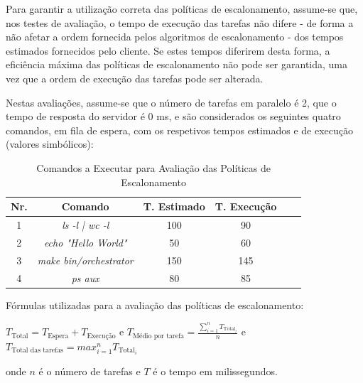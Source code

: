 \documentclass[a4paper,11pt]{scrreprt}
\begin{document}
    Para garantir a utilização correta das políticas de escalonamento,
    assume-se que, nos testes de avaliação, o tempo de execução das tarefas
    não difere - de forma a não afetar a ordem fornecida pelos algoritmos
    de escalonamento - dos tempos estimados fornecidos pelo cliente.
    Se estes tempos diferirem desta forma, a eficiência máxima das políticas de escalonamento
    não pode ser garantida, uma vez que a ordem de execução das tarefas pode ser alterada.

    Nestas avaliações, assume-se que o número de tarefas em paralelo é 2,
    que o tempo de resposta do servidor é 0 ms,
    e são considerados os seguintes quatro comandos, em fila de espera,
    com os respetivos tempos estimados e de execução (valores simbólicos):

    \begin{table}[!ht]
        \centering
        \begin{tabular}{|c|c|c|c|c|c|}
            \hline
            \rowcolor{gray!20!white}
            \textbf{Nr.} & \textbf{Comando} & \textbf{T. Estimado} & \textbf{T. Execução} \\
            \hline
            1 & \textit{ls -l | wc -l} & 100 &  90 \\
            \hline
            2 & \textit{echo "Hello World"} &  50 &  60 \\
            \hline
            3 & \textit{make bin/orchestrator} & 150 & 145 \\
            \hline
            4 & \textit{ps aux} &  80 &  85 \\
            \hline
        \end{tabular}
        \caption{\small Comandos a Executar para Avaliação das Políticas de Escalonamento}
    \end{table}

    Fórmulas utilizadas para a avaliação das políticas de escalonamento:

    \begin{minipage}{\textwidth}
        \centering
        $T_{\text{Total}} = T_{\text{Espera}} + T_{\text{Execução}}$
        \quad e \quad
        $T_{\text{Médio por tarefa}} = \frac{\sum_{i=1}^{n} T_{\text{Total}_{i}}}{n}$
        \quad e \quad
        $T_{\text{Total das tarefas}} = max_{i=1}^{n} T_{\text{Total}_{i}}$

        \vspace{0.2cm}
        onde $n$ é o número de tarefas e $T$ é o tempo em milissegundos.
    \end{minipage}
\end{document}
